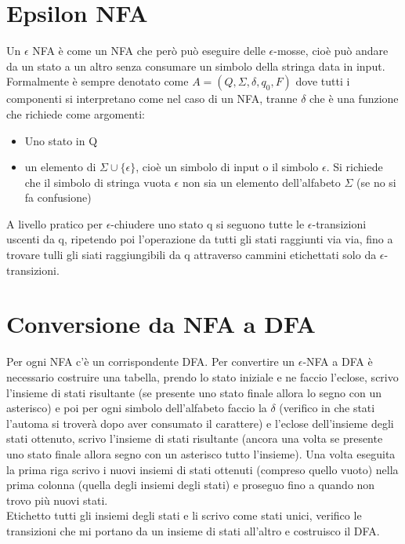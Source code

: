 \section{Epsilon NFA}
Un $\epsilon$ NFA è come un NFA che però può eseguire delle $\epsilon$-mosse,
cioè può andare da un stato a un altro senza consumare un simbolo della stringa
data in input.
Formalmente è sempre denotato come $A = (Q, \Sigma, \delta, q_0, F)$ dove tutti 
i componenti si interpretano come nel caso di un NFA, tranne $\delta$ che è una funzione
che richiede come argomenti:
\begin{itemize}
    \item Uno stato in Q
    \item un elemento di $\Sigma \cup \{\epsilon\}$, cioè un simbolo di input o il
    simbolo $\epsilon$. Si richiede che il simbolo di stringa vuota $\epsilon$ non sia
    un elemento dell'alfabeto $\Sigma$ (se no si fa confusione)
\end{itemize}

A livello pratico per $\epsilon$-chiudere uno
stato q si seguono tutte le $\epsilon$-transizioni uscenti da q, ripetendo poi l'operazione da tutti gli
stati raggiunti via via, fino a trovare tulli gli siati raggiungibili da q attraverso cammini
etichettati solo da $\epsilon$-transizioni.

\section{Conversione da NFA a DFA}
Per ogni NFA c'è un corrispondente DFA.
Per convertire un $\epsilon$-NFA a DFA è necessario costruire una tabella, 
prendo lo stato iniziale e ne faccio l'eclose, scrivo l'insieme di stati risultante (se presente
uno stato finale allora lo segno con un asterisco) e poi per ogni simbolo dell'alfabeto
faccio la $\delta$ (verifico in che stati l'automa si troverà dopo aver consumato il carattere) 
e l'eclose dell'insieme degli stati ottenuto, scrivo l'insieme di stati risultante 
(ancora una volta se presente uno stato finale allora segno con un asterisco tutto l'insieme).
Una volta eseguita la prima riga scrivo i nuovi insiemi di stati ottenuti (compreso quello vuoto)
nella prima colonna (quella degli insiemi degli stati) e proseguo fino a quando non trovo più nuovi
stati.
\\ Etichetto tutti gli insiemi degli stati e li scrivo come stati unici, verifico le transizioni che
mi portano da un insieme di stati all'altro e costruisco il DFA.

